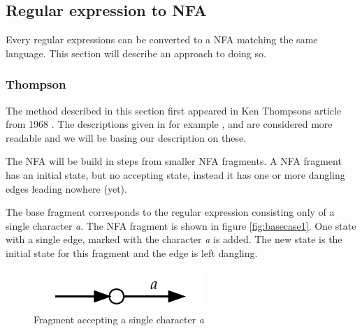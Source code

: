 \subsection{Regular expression to NFA}
\label{sec:from_regular_expression_to_nfa}
Every regular expressions can be converted to a NFA matching the same
language.  This section will describe an approach to doing so.

\subsubsection{Thompson}
\label{sec:re2nfa_thompson_theory}
The method described in this section first appeared in Ken Thompsons
article from 1968 \cite{Thompson1968}. The descriptions given in for
example \cite{HopcroftJohnE.AndMotwaniRajeevAndUllman2001},
\cite{Aho:1986:CPT:6448} and \cite{RussCox} are considered more
readable and we will be basing our description on these.

The NFA will be build in steps from smaller NFA fragments. A NFA
fragment has an initial state, but no accepting state, instead it has
one or more dangling edges leading nowhere (yet).



The base fragment corresponds to the regular expression consisting
only of a single character \textit{a}. The NFA fragment is shown in
figure \vref{fig:basecase1}. One state with a single edge, marked with
the character \textit{a} is added. The new state is the initial state
for this fragment and the edge is left dangling.

\begin{figure}
  \centering
  \includegraphics{parsing/basecase1}
  \caption{Fragment accepting a single character \textit{a}}
  \label{fig:basecase1}
\end{figure}

